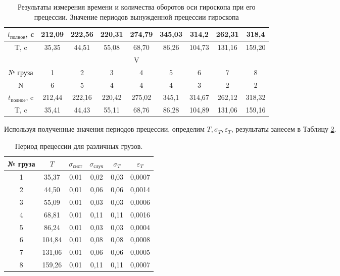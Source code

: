 \documentclass[12pt,a4paper]{article}
\begin{document}
\begin{table}[h]
\begin{center}
\begin{tabular}{|c|c|c|c|c|c|c|c|c|}
			$t_{\text{полное}}$, c    & 212,09 & 222,56 & 220,31 & 274,79 & 345,03 & 314,2  & 262,31 & 318,4  \\ \hline
			T, c & 35,35 & 44,51 & 55,08 & 68,70 & 86,26 & 104,73 & 131,16 & 159,20 \\ \hline
			\multicolumn{9}{|c|}{V}                                                      \\ \hline
			№ груза & 1      & 2      & 3      & 4      & 5      & 6      & 7      & 8      \\ \hline
			N    & 6      & 5      & 4      & 4      & 4      & 3      & 2      & 2      \\ \hline
			$t_{\text{полное}}$, c & 212,44 & 222,16 & 220,42 & 275,02 & 345,1  & 314,67 & 262,12 & 318,32 \\ \hline
			T, c & 35,41 & 44,43 & 55,11 & 68,76 & 86,28 & 104,89 & 131,06 & 159,16 \\ \hline
		\end{tabular}
		\caption{Результаты измерения времени и количества оборотов оси гироскопа при его прецессии. Значение периодов вынужденной прецессии гироскопа}
		\label{tab:time_and_count_of_rev}
	\end{center}
\end{table}



Используя полученные значения периодов прецессии, определим $T, \sigma_{T}, \varepsilon_{T}$, результаты занесем в Таблицу \ref{tab:periods_and_sigma}.

\begin{table}[h]
	\begin{center}
		\begin{tabular}{|c|c|c|c|c|c|}
			\hline
			№ груза & $T$ & $\sigma_{\text{сист}}$ & $\sigma_{\text{случ}}$ & $\sigma_{T}$ & $\varepsilon_{T}$ \\ \hline
			1       & 35,37  & 0,01       & 0,02       & 0,03  & 0,0007  \\ \hline
			2       & 44,50  & 0,01       & 0,06       & 0,06  & 0,0014  \\ \hline
			3       & 55,09  & 0,01       & 0,03       & 0,03  & 0,0006  \\ \hline
			4       & 68,81  & 0,01       & 0,11       & 0,11  & 0,0016  \\ \hline
			5       & 86,24  & 0,01       & 0,03       & 0,03  & 0,0004  \\ \hline
			6       & 104,84 & 0,01       & 0,08       & 0,08  & 0,0008  \\ \hline
			7       & 131,06 & 0,01       & 0,06       & 0,06  & 0,0005  \\ \hline
			8       & 159,26 & 0,01       & 0,11       & 0,11  & 0,0007  \\ \hline
		\end{tabular}
		\caption{Период прецессии для различных грузов.}
		\label{tab:periods_and_sigma}
	\end{center}
\end{table}
\end{document}
